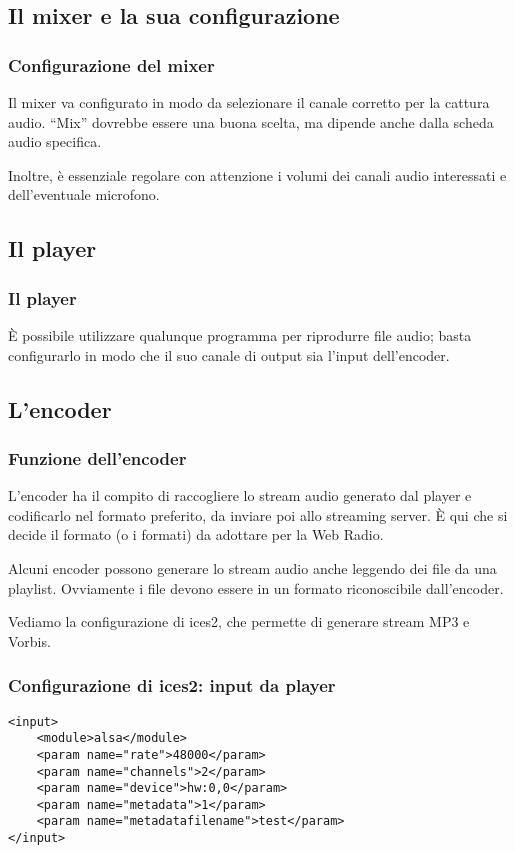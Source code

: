 \documentclass{beamer}
\begin{document}
\subsection{Il mixer e la sua configurazione}

\begin{frame}\frametitle{Configurazione del mixer}
Il mixer va configurato in modo da selezionare il canale corretto per
la cattura audio. ``Mix'' dovrebbe essere una buona scelta, ma dipende
anche dalla scheda audio specifica.

Inoltre, è essenziale regolare con attenzione i volumi dei canali
audio interessati e dell'eventuale microfono.
\end{frame}

\subsection{Il player}

\begin{frame}\frametitle{Il player}
È possibile utilizzare qualunque programma per riprodurre file audio;
basta configurarlo in modo che il suo canale di output sia l'input
dell'encoder.
\end{frame}

\subsection{L'encoder}

\begin{frame}\frametitle{Funzione dell'encoder}
L'encoder ha il compito di raccogliere lo stream audio generato dal
player e codificarlo nel formato preferito, da inviare poi allo
streaming server. È qui che si decide il formato (o i formati) da
adottare per la Web Radio.

Alcuni encoder possono generare lo stream audio anche leggendo dei
file da una playlist. Ovviamente i file devono essere in un formato
riconoscibile dall'encoder.

Vediamo la configurazione di ices2, che permette di generare stream
MP3 e Vorbis.
\end{frame}

\begin{frame}
\frametitle{Configurazione di ices2: input da player}
\begin{verbatim}
<input>
    <module>alsa</module>
    <param name="rate">48000</param>
    <param name="channels">2</param>
    <param name="device">hw:0,0</param>
    <param name="metadata">1</param>
    <param name="metadatafilename">test</param>
</input>
\end{verbatim}
\end{frame}
\end{document}
